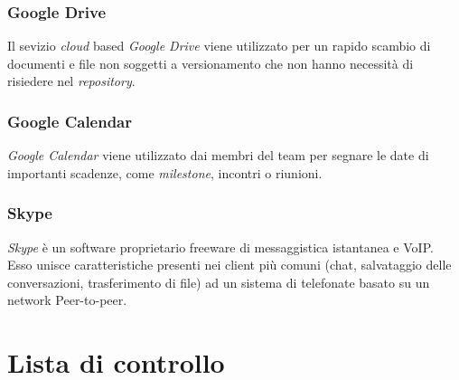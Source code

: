 \subsubsection{Google Drive}
Il sevizio \emph{cloud} based \emph{Google Drive} viene utilizzato
per un rapido scambio di documenti e file non soggetti a versionamento
che non hanno necessità di risiedere nel \emph{repository}.

\subsubsection{Google Calendar}
\emph{Google Calendar} viene utilizzato dai membri del team per
segnare le date di importanti scadenze, come \emph{milestone},
incontri o riunioni. 

\subsubsection{Skype}
\emph{Skype} è un software proprietario freeware di messaggistica
istantanea e VoIP. Esso unisce caratteristiche presenti nei client più
comuni (chat, salvataggio delle conversazioni, trasferimento di file)
ad un sistema di telefonate basato su un network Peer-to-peer. 










\clearpage

\appendix



\section{Lista di controllo}



